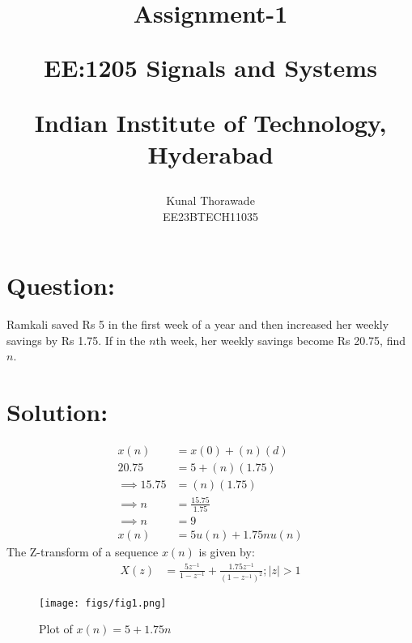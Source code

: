 \documentclass[journal,12pt,twocolumn]{IEEEtran}
\theoremstyle{remark}
\begin{document}
%




\vspace{3cm}

\title{
	Assignment-1 

	\large{EE:1205 Signals and Systems}

	Indian Institute of Technology, Hyderabad
}
\author{Kunal Thorawade

EE23BTECH11035
}	

\maketitle


\newpage


\bigskip
 
 \renewcommand{\thefigure}{\theenumi}
 \renewcommand{\thetable}{\theenumi}

 \section{\Large Question:}  Ramkali saved Rs 5 in the first week of a year and then increased her weekly savings by Rs 1.75. If in the $n$th week, her weekly savings become Rs 20.75, find $n$.

 \section{\Large Solution:} 
 \fi
 

 \begin{align} 
	 x(n) &= x(0) + (n)(d)
	 \\ 20.75 &= 5 + (n)(1.75)  
	 \\ \implies 15.75 &= (n)(1.75)
	 \\ \implies n &= \frac{15.75}{1.75}
	 \\ \implies n &= 9
	 \\x(n) &= 5u(n) + 1.75nu(n)
 \end{align}
 The Z-transform of a sequence $x(n)$ is given by:
 \begin{align}
	  X(z) &= \frac{5z^{-1}}{1-z^{-1}}+\frac{1.75z^{-1}}{(1-z^{-1})^{2}} ; |z| > 1
 \end{align}

 \begin{figure}
	     \centering
	         \texttt{[image: figs/fig1.png]}
		     \caption{Plot of $x(n) = 5 + 1.75n$}
		         \label{fig:enter-label}
 \end{figure}
\end{document}
